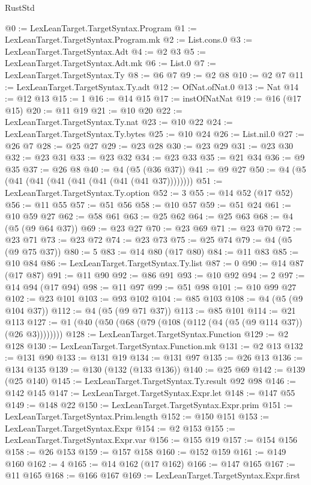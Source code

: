 \begin{lexlean}{RustStd}
\begin{coremodule}
{\begin{coremodule}
{{{{{{{{{{{{{{{{{{{{{{{{{{{{{{{{{{{{{{{@0 := LexLeanTarget.TargetSyntax.Program
@1 := LexLeanTarget.TargetSyntax.Program.mk
@2 := List.cons.{0}
@3 := LexLeanTarget.TargetSyntax.Adt
@4 := @2 @3
@5 := LexLeanTarget.TargetSyntax.Adt.mk
@6 := List.{0}
@7 := LexLeanTarget.TargetSyntax.Ty
@8 := @6 @7
@9 := @2 @8
@10 := @2 @7
@11 := LexLeanTarget.TargetSyntax.Ty.adt
@12 := OfNat.ofNat.{0}
@13 := Nat
@14 := @12 @13
@15 := 1
@16 := @14 @15
@17 := instOfNatNat
@19 := @16 (@17 @15)
@20 := @11 @19
@21 := @10 @20
@22 := LexLeanTarget.TargetSyntax.Ty.nat
@23 := @10 @22
@24 := LexLeanTarget.TargetSyntax.Ty.bytes
@25 := @10 @24
@26 := List.nil.{0}
@27 := @26 @7
@28 := @25 @27
@29 := @23 @28
@30 := @23 @29
@31 := @23 @30
@32 := @23 @31
@33 := @23 @32
@34 := @23 @33
@35 := @21 @34
@36 := @9 @35
@37 := @26 @8
@40 := @4 (@5 (@36 @37))
@41 := @9 @27
@50 := @4 (@5 (@41 (@41 (@41 (@41 (@41 (@41 (@41 @37))))))))
@51 := LexLeanTarget.TargetSyntax.Ty.option
@52 := 3
@55 := @14 @52 (@17 @52)
@56 := @11 @55
@57 := @51 @56
@58 := @10 @57
@59 := @51 @24
@61 := @10 @59 @27
@62 := @58 @61
@63 := @25 @62
@64 := @25 @63
@68 := @4 (@5 (@9 @64 @37))
@69 := @23 @27
@70 := @23 @69
@71 := @23 @70
@72 := @23 @71
@73 := @23 @72
@74 := @23 @73
@75 := @25 @74
@79 := @4 (@5 (@9 @75 @37))
@80 := 5
@83 := @14 @80 (@17 @80)
@84 := @11 @83
@85 := @10 @84
@86 := LexLeanTarget.TargetSyntax.Ty.list
@87 := 0
@90 := @14 @87 (@17 @87)
@91 := @11 @90
@92 := @86 @91
@93 := @10 @92
@94 := 2
@97 := @14 @94 (@17 @94)
@98 := @11 @97
@99 := @51 @98
@101 := @10 @99 @27
@102 := @23 @101
@103 := @93 @102
@104 := @85 @103
@108 := @4 (@5 (@9 @104 @37))
@112 := @4 (@5 (@9 @71 @37))
@113 := @85 @101
@114 := @21 @113
@127 := @1 (@40 (@50 (@68 (@79 (@108 (@112 (@4 (@5 (@9 @114 @37)) (@26 @3))))))))
@128 := LexLeanTarget.TargetSyntax.Function
@129 := @2 @128
@130 := LexLeanTarget.TargetSyntax.Function.mk
@131 := @2 @13
@132 := @131 @90
@133 := @131 @19
@134 := @131 @97
@135 := @26 @13
@136 := @134 @135
@139 := @130 (@132 (@133 @136))
@140 := @25 @69
@142 := @139 (@25 @140)
@145 := LexLeanTarget.TargetSyntax.Ty.result @92 @98
@146 := @142 @145
@147 := LexLeanTarget.TargetSyntax.Expr.let
@148 := @147 @55
@149 := @148 @22
@150 := LexLeanTarget.TargetSyntax.Expr.prim
@151 := LexLeanTarget.TargetSyntax.Prim.length
@152 := @150 @151
@153 := LexLeanTarget.TargetSyntax.Expr
@154 := @2 @153
@155 := LexLeanTarget.TargetSyntax.Expr.var
@156 := @155 @19
@157 := @154 @156
@158 := @26 @153
@159 := @157 @158
@160 := @152 @159
@161 := @149 @160
@162 := 4
@165 := @14 @162 (@17 @162)
@166 := @147 @165
@167 := @11 @165
@168 := @166 @167
@169 := LexLeanTarget.TargetSyntax.Expr.first
}}}}}}}}}}}}}}}}}}}}}}}}}}}}}}}}}}}}}}}
\end{coremodule}}
\end{coremodule}
\end{lexlean}
